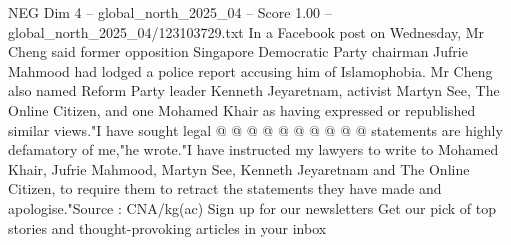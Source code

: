 \begin{textsample}{NEG Dim 4 – global\_north\_2025\_04 – Score 1.00 – global\_north\_2025\_04/123103729.txt}
In a Facebook post on Wednesday, Mr Cheng said former opposition Singapore Democratic Party chairman Jufrie Mahmood had lodged a police report accusing him of Islamophobia.
Mr Cheng also named Reform Party leader Kenneth Jeyaretnam, activist Martyn See, The Online Citizen, and one Mohamed Khair as having expressed or republished similar views."I have sought legal @ @ @ @ @ @ @ @ @ @ statements are highly defamatory of me,"he wrote."I have instructed my lawyers to write to Mohamed Khair, Jufrie Mahmood, Martyn See, Kenneth Jeyaretnam and The Online Citizen, to require them to retract the statements they have made and apologise."Source : CNA/kg(ac) Sign up for our newsletters Get our pick of top stories and thought-provoking articles in your inbox

\end{textsample}
